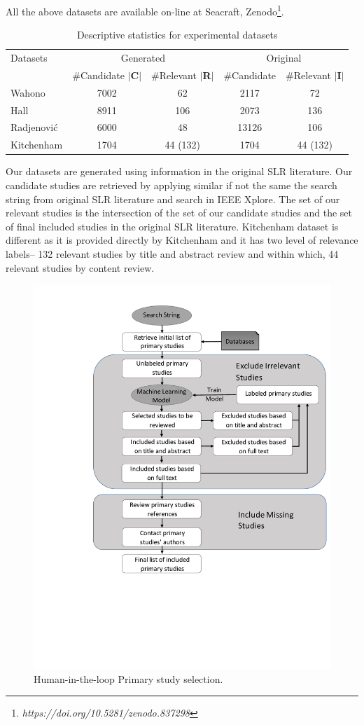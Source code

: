 \documentclass{svjour3}
\theoremstyle{break}
\begin{document}
All the above datasets are available on-line at Seacraft, Zenodo\footnote{\em https://doi.org/10.5281/zenodo.837298}.

\begin{table}
\caption{Descriptive statistics for experimental datasets}
\label{tab: number}
\begin{center}
\begin{tabular}{ |l|c|c|c|c| }
  \hline
   Datasets & \multicolumn{2}{|c|}{Generated} & \multicolumn{2}{|c|}{Original} \\
  \cline{2-5}
  & \#Candidate $|$\textbf{C}$|$ & \#Relevant $|$\textbf{R}$|$& \#Candidate & \#Relevant $|$\textbf{I}$|$\\
  \hline
  Wahono & 7002 & 62 & 2117 & 72\\
  \hline
  Hall & 8911 & 106 & 2073 & 136 \\
  \hline
  Radjenovi{\'c} & 6000 & 48 & 13126 & 106\\
  \hline
  Kitchenham & 1704 & 44 (132) & 1704 & 44 (132) \\
  \hline
\end{tabular}
\end{center}
{\footnotesize Our datasets are generated using information in the original SLR literature. Our candidate studies are retrieved by applying similar if not the same the search string from original SLR literature and search in IEEE Xplore. The set of our relevant studies is the intersection of the set of our candidate studies and the set of final included studies in the original SLR literature. Kitchenham dataset is different as it is provided directly by Kitchenham and it has two level of relevance labels-- 132 relevant studies by title and abstract review and within which, 44 relevant studies by content review.}
\end{table}




\begin{figure}[t]
    \centering
    \includegraphics[width=0.6\linewidth]{Learning_based_primary_study_selection.pdf}
    \caption{Human-in-the-loop Primary study selection.}
    \label{fig: learning}
\end{figure}
\end{document}
